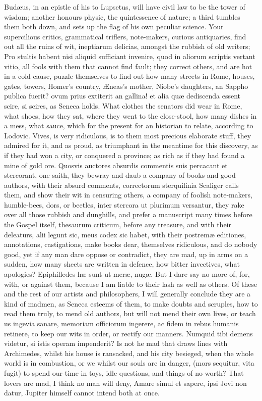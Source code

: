 {Bud\ae{}us, in an epistle of his to Lupsetus, will have civil law to be
the tower of wisdom; another honours physic, the quintessence of
nature; a third tumbles them both down, and sets up the flag of his own
peculiar science. Your supercilious critics, grammatical triflers,
note-makers, curious antiquaries, find out all the ruins of wit,
ineptiarum delicias, amongst the rubbish of old writers; Pro
stultis habent nisi aliquid sufficiant invenire, quod in aliorum
scriptis vertant vitio, all fools with them that cannot find fault;
they correct others, and are hot in a cold cause, puzzle themselves to
find out how many streets in Rome, houses, gates, towers, Homer's
country, \AE{}neas's mother, Niobe's daughters, an Sappho publica fuerit?
ovum prius extiterit an gallina! \etc{} et alia qu\ae{} dediscenda
essent scire, si scires, as Seneca holds. What clothes the
senators did wear in Rome, what shoes, how they sat, where they went to
the close-stool, how many dishes in a mess, what sauce, which for the
present for an historian to relate, according to Lodovic. Vives,
is very ridiculous, is to them most precious elaborate stuff, they
admired for it, and as proud, as triumphant in the meantime for this
discovery, as if they had won a city, or conquered a province; as rich
as if they had found a mine of gold ore. Quosvis auctores absurdis
commentis suis percacant et stercorant, one saith, they bewray and daub
a company of books and good authors, with their absurd comments,
correctorum sterquilinia Scaliger calls them, and show their wit
in censuring others, a company of foolish note-makers, humble-bees,
dors, or beetles, inter stercora ut plurimum versantur, they rake over
all those rubbish and dunghills, and prefer a manuscript many times
before the Gospel itself, thesaurum criticum, before any treasure,
and with their deleaturs, alii legunt sic, meus codex sic habet, with
their postrem\ae{} editiones, annotations, castigations, \etc{} make books
dear, themselves ridiculous, and do nobody good, yet if any man dare
oppose or contradict, they are mad, up in arms on a sudden, how many
sheets are written in defence, how bitter invectives, what apologies?
Epiphilledes h\ae{} sunt ut mer\ae{}, nug\ae{}. But I dare say no more of,
for, with, or against them, because I am liable to their lash as well
as others. Of these and the rest of our artists and philosophers, I
will generally conclude they are a kind of madmen, as  Seneca
esteems of them, to make doubts and scruples, how to read them truly,
to mend old authors, but will not mend their own lives, or teach us
ingevia sanare, memoriam officiorum ingerere, ac fidem in rebus humanis
retinere, to keep our wits in order, or rectify our manners. Numquid
tibi demens videtur, si istis operam impenderit? Is not he mad that
draws lines with Archimedes, whilst his house is ransacked, and his
city besieged, when the whole world is in combustion, or we whilst our
souls are in danger, (mors sequitur, vita fugit) to spend our time in
toys, idle questions, and things of no worth?
That lovers are mad, I think no man will deny, Amare simul et
sapere, ipsi Jovi non datur, Jupiter himself cannot intend both at
once.

}

